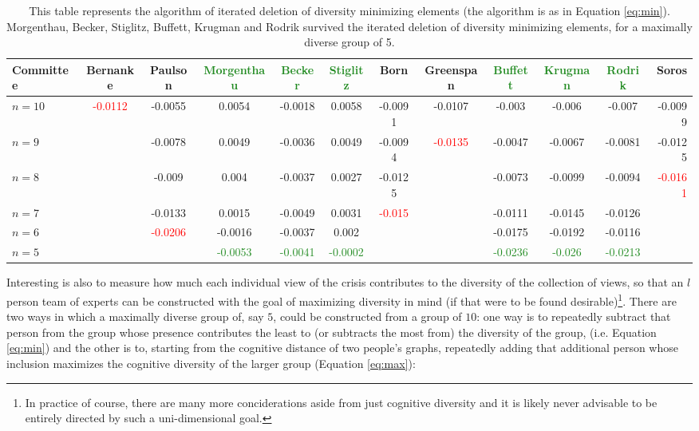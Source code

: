 \documentclass[11pt]{article}
\begin{document}
\begin{table}[h]\hspace*{-3.5cm}
\centering
\footnotesize
\begin{tabular}{l*{10}{c}r}
Committee & Bernanke & Paulson & \textcolor{ForestGreen}{Morgenthau} & \textcolor{ForestGreen}{Becker} & \textcolor{ForestGreen}{Stiglitz} & Born & Greenspan & \textcolor{ForestGreen}{Buffett} & \textcolor{ForestGreen}{Krugman} & \textcolor{ForestGreen}{Rodrik} & Soros\\
\hline
$n=10$ & \textcolor{red}{-0.0112} & -0.0055 & 0.0054 & -0.0018 & 0.0058 & -0.0091 & -0.0107 & -0.003 & -0.006 & -0.007 & -0.0099 \\
$n=9$ & & -0.0078 & 0.0049 & -0.0036 & 0.0049 & -0.0094 & \textcolor{red}{-0.0135} & -0.0047 & -0.0067 & -0.0081 & -0.0125\\
$n=8$ & & -0.009 & 0.004 & -0.0037 & 0.0027 & -0.0125 & & -0.0073 & -0.0099 & -0.0094 & \textcolor{red}{-0.0161}\\
$n=7$ & & -0.0133 & 0.0015 & -0.0049 & 0.0031 & \textcolor{red}{-0.015} & & -0.0111 & -0.0145 & -0.0126 & \\
$n=6$ & & \textcolor{red}{-0.0206} &-0.0016 & -0.0037 & 0.002 & & & -0.0175 & -0.0192 & -0.0116 & \\
\hline
$n=5$ & & &\textcolor{ForestGreen}{-0.0053} & \textcolor{ForestGreen}{-0.0041} & \textcolor{ForestGreen}{-0.0002}& & & \textcolor{ForestGreen}{-0.0236} & \textcolor{ForestGreen}{-0.026} & \textcolor{ForestGreen}{-0.0213} & \\
\end{tabular} \hspace*{-3.5cm}
\caption{This table represents the algorithm of iterated deletion of diversity minimizing elements (the algorithm is as in Equation \ref{eq:min}). Morgenthau, Becker, Stiglitz, Buffett, Krugman and Rodrik survived the iterated deletion of diversity minimizing elements, for a maximally diverse group of 5.} \label{table:minimize}
\end{table}

Interesting is also to measure how much each individual view of the crisis contributes to the diversity of the collection of views, so that an $l$ person team of experts can be constructed with the goal of maximizing diversity in mind (if that were to be found desirable)\footnote{In practice of course, there are many more conciderations aside from just cognitive diversity and it is likely never advisable to be entirely directed by such a uni-dimensional goal.
 }. There are two ways in which a maximally diverse group of, say $5$, could be constructed from a group of $10$: one way is to repeatedly subtract that person from the group whose presence contributes the least to (or subtracts the most from) the diversity of the group, (i.e. Equation \ref{eq:min}) and the other is to, starting from the cognitive distance of two people's graphs, repeatedly adding that additional person whose inclusion maximizes the cognitive diversity of the larger group (Equation \ref{eq:max}):
\end{document}
